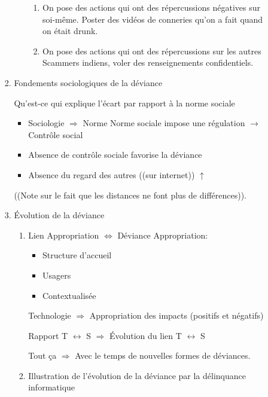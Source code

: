 \documentclass[11pt]{article}
\begin{document}
\begin{enumerate}
\begin{enumerate}
\begin{enumerate}
\begin{enumerate}
\begin{enumerate}
\item On pose des actions qui ont des répercussions négatives sur soi-même.
\label{sec:orgaa3f201}
Poster des vidéos de conneries qu'on a fait quand on était drunk.
\item On pose des actions qui ont des répercussions sur les autres
\label{sec:org8ac5c9a}
Scammers indiens, voler des renseignements confidentiels.
\end{enumerate}
\end{enumerate}

\item Fondements sociologiques de la déviance
\label{sec:org33c5ce0}

Qu'est-ce qui explique l'écart par rapport à la norme sociale
\begin{itemize}
\item Sociologie \(\Rightarrow\) Norme Norme sociale impose une régulation \(\rightarrow\) Contrôle social
\item Absence de contrôle sociale favorise la déviance
\item Absence du regard des autres ((sur internet)) \(\uparrow\)
\end{itemize}
((Note sur le fait que les distances ne font plus de différences)).

\item Évolution de la déviance
\label{sec:orgcd9b93d}

\begin{enumerate}
\item Lien Appropriation \(\Leftrightarrow\) Déviance
\label{sec:org920d6b4}
Appropriation:
\begin{itemize}
\item Structure d'accueil
\item Usagers
\item Contextualisée
\end{itemize}

Technologie \(\Rightarrow\) Appropriation des impacts (positifs et négatifs)

Rapport T \(\leftrightarrow\) S \(\Rightarrow\) Évolution du lien T \(\leftrightarrow\) S 

Tout ça \(\Rightarrow\) Avec le temps de nouvelles formes de déviances.

\item Illustration de l'évolution de la déviance par la délinquance informatique
\label{sec:orgcb42d48}


\end{enumerate}
\end{enumerate}
\end{enumerate}
\end{enumerate}
\end{document}

